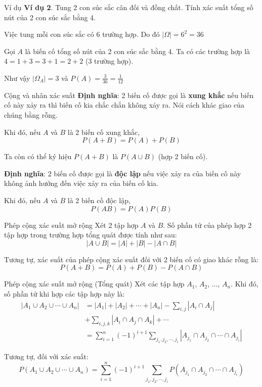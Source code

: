 \documentclass[aspectratio=169,xcolor=dvipsnames,serif]{beamer}
\begin{document}
\begin{frame}{Ví dụ}
    \textbf{Ví dụ 2}. Tung 2 con súc sắc cân đối và đồng chất. Tính xác suất tổng số nút của 2 con súc sắc bằng 4.
    
    Việc tung mỗi con súc sắc có 6 trường hợp. Do đó $|\Omega| = 6^2 = 36$
    
    Gọi $A$ là biến cố tổng số nút của 2 con súc sắc bằng 4. Ta có các trường hợp là $4=1+3=3+1=2+2$ (3 trường hợp).
    
    Như vậy $|\Omega_A| = 3$ và $P(A) = \frac{3}{36} = \frac{1}{12}$
\end{frame}

\begin{frame}{Cộng và nhân xác suất}
    \textbf{Định nghĩa}: 2 biến cố được gọi là \textbf{xung khắc} nếu biến cố này xảy ra thì biến cố kia chắc chắn không xảy ra. Nói cách khác giao của chúng bằng rỗng.
    
    Khi đó, nếu $A$ và $B$ là 2 biến cố xung khắc, \[P(A + B) = P(A) + P(B)\]
    
    Ta còn có thể ký hiệu $P(A+B)$ là $P(A \cup B)$ (hợp 2 biến cố).
    
    \textbf{Định nghĩa}: 2 biến cố được gọi là \textbf{độc lập} nếu việc xảy ra của biến cố này không ảnh hưởng đến việc xảy ra của biến cố kia. 
    
    Khi đó, nếu $A$ và $B$ là 2 biến cố độc lập, \[P(AB) = P(A)P(B)\]
    
\end{frame}

\begin{frame}{Phép cộng xác suất mở rộng}
    Xét 2 tập hợp $A$ và $B$. Số phần tử của phép hợp 2 tập hợp trong trường hợp tổng quát được tính như sau: \[|A \cup B| = |A| + |B| - |A \cap B|\]
    
    Tương tự, xác suất của phép cộng xác suất đối với 2 biến cố có giao khác rỗng là: \[P(A + B) = P(A) + P(B) - P(A \cap B)\]
\end{frame}

\begin{frame}{Phép cộng xác suất mở rộng (Tổng quát)}
    Xét các tập hợp $A_1$, $A_2$, ..., $A_n$. Khi đó, số phần tử khi hợp các tập hợp này là:
    \begin{equation*}
        \begin{split}
            |A_1 \cup A_2 \cup \cdots \cup A_n| & = |A_1| + |A_2| + \cdots + |A_n| - \sum_{i, j}|A_i \cap A_j| \\ & + \sum_{i, j, k} |A_i \cap A_j \cap A_k| + \cdots \\ & = \sum_{i=1}^n (-1)^{i+1} \sum_{j_1, j_2, \cdots, j_i} |A_{j_1} \cap A_{j_2} \cap \cdots \cap A_{j_i} |
        \end{split}
    \end{equation*}
    
    Tương tự, đối với xác suất:
    \begin{equation*}
        P(A_1 \cup A_2 \cup \cdots \cup A_n) = \sum_{i=1}^n (-1)^{i+1} \sum_{j_1, j_2, \cdots, j_i} P(A_{j_1} \cap A_{j_2} \cap \cdots \cap A_{j_i})
    \end{equation*}
\end{frame}
\end{document}
